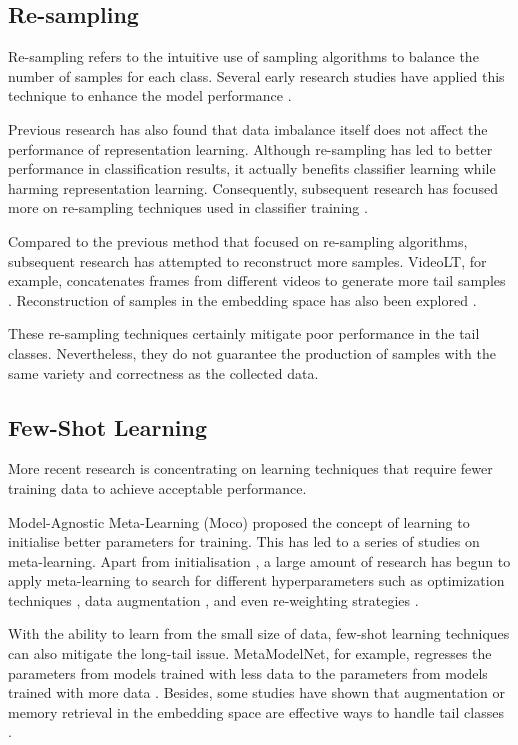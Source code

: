 \subsection{Re-sampling}
Re-sampling refers to the intuitive use of sampling algorithms to balance the number of samples for each class. Several early research studies have applied this technique to enhance the model performance \parencite{shen2016relay, 5128907, mahajan2018exploring}.

Previous research has also found that data imbalance itself does not affect the performance of representation learning. Although re-sampling has led to better performance in classification results, it actually benefits classifier learning while harming representation learning. Consequently, subsequent research has focused more on re-sampling techniques used in classifier training \parencite{zhou2020bbn, kang2019decoupling}.

Compared to the previous method that focused on re-sampling algorithms, subsequent research has attempted to reconstruct more samples. VideoLT, for example, concatenates frames from different videos to generate more tail samples \parencite{zhang2021videolt}. Reconstruction of samples in the embedding space has also been explored \parencite{liu2022long, perrett2023use}.

These re-sampling techniques certainly mitigate poor performance in the tail classes. Nevertheless, they do not guarantee the production of samples with the same variety and correctness as the collected data.

\subsection{Few-Shot Learning}
More recent research is concentrating on learning techniques that require fewer training data to achieve acceptable performance.

Model-Agnostic Meta-Learning (Moco) \parencite{finn2017model} proposed the concept of learning to initialise better parameters for training. This has led to a series of studies on meta-learning. Apart from initialisation \parencite{nichol2018first, 2018Reptile}, a large amount of research has begun to apply meta-learning to search for different hyperparameters such as optimization techniques \parencite{andrychowicz2016learning}, data augmentation \parencite{li2020dada, galashov2022data, cubuk2018autoaugment}, and even re-weighting strategies \parencite{shu2019meta}.

With the ability to learn from the small size of data, few-shot learning techniques can also mitigate the long-tail issue. MetaModelNet, for example, regresses the parameters from models trained with less data to the parameters from models trained with more data \parencite{NIPS2017_147ebe63}. Besides, some studies have shown that augmentation or memory retrieval in the embedding space are effective ways to handle tail classes \parencite{liu2019large, Zhu_2020_CVPR, li2021metasaug, Fu_2022_ACCV}.

